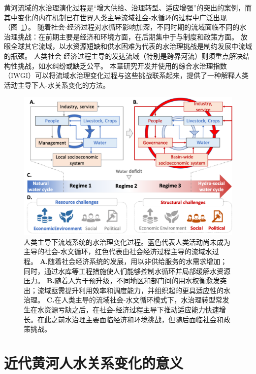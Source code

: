 黄河流域的水治理演化过程是“增大供给、治理转型、适应增强”的突出的案例，而其中变化的内在机制已在世界人类主导流域社会-水循环的过程中广泛出现（图~\ref{fig:summary}）。
随着社会-经济过程对水循环影响加深，不同时期的流域面临不同的水治理挑战：在前期主要是经济和环境方面，在后期集中于与制度和政策方面。
放眼全球其它流域，以水资源短缺和供水困难为代表的水治理挑战是制约发展中流域的瓶颈\cite{allan2019,speed2013,liu2012a}。
人类社会-经济过程主导的发达流域（特别是跨界河流）则须重点解决结构性挑战，如水纠纷或缺乏公平\cite{mirumachi2015}。
本章研究开发并使用的综合水治理指数（IWGI）可以将流域水治理变化过程与这些挑战联系起来，提供了一种解释人类活动主导下人-水关系变化的方法。

\begin{figure}[htbp!]
	\includegraphics[width=\textwidth]{img/ch4/transition.png}
	\caption[人类主导下流域系统的水治理变化过程]{
		人类主导下流域系统的水治理变化过程。蓝色代表人类活动尚未成为主导的社会-水文循环，红色代表由社会经济过程主导的流域水过程。
        \textbf{A.}随着社会经济系统的发展，用以非供给服务的水需求增加；同时，通过水库等工程措施使人们能够控制水循环并局部缓解水资源压力。
        \textbf{B.}随着人为干预升级，不同地区和部门间的用水权衡愈发突出；流域亟需提升利用效率和调度能力，并组织起的更具适应性的水治理。
        \textbf{C.}在人类主导的流域社会-水文循环模式下，水治理转型常发生在水资源亏缺之后，在社会-经济过程主导下推动适应能力快速增长。在此之前水治理主要面临经济和环境挑战，但随后面临社会和政策挑战。
	}\label{fig:summary}
\end{figure}

\section{近代黄河人水关系变化的意义}

